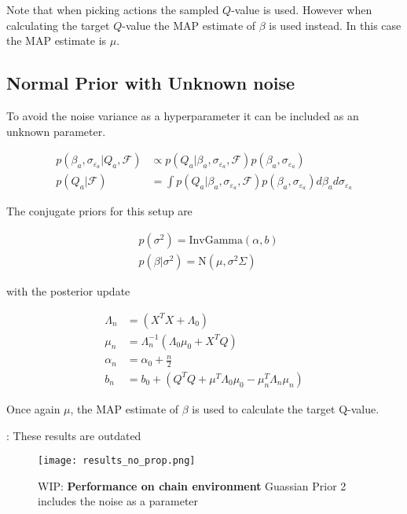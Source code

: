 Note that when picking actions the sampled $Q$-value is used. However when calculating the target $Q$-value the MAP estimate of $\beta$ is used instead. In this case the MAP estimate is $\mu$. 

\subsection{Normal Prior with Unknown noise}

To avoid the noise variance as a hyperparameter it can be included as an unknown parameter.

\begin{align*}
    p(\beta_a, \sigma_{\varepsilon_a}|Q_a, \mathcal{F}) &\propto p(Q_a| \beta_a, \sigma_{\varepsilon_a}, \mathcal{F})p(\beta_a, \sigma_{\varepsilon_a}) \\
    p(Q_a|\mathcal{F}) &= \int p(Q_a|\beta_a, \sigma_{\varepsilon_a}, \mathcal{F}) p(\beta_a, \sigma_{\varepsilon_a})d\beta_a d\sigma_{\varepsilon_a}
\end{align*}

The conjugate priors for this setup are

\begin{align*}
    & p(\sigma^2) = \text{InvGamma}(\alpha, b)          \\
    & p(\beta|\sigma^2) = \text{N}(\mu, \sigma^2\Sigma) 
\end{align*}

with the posterior update

\begin{align*}
	\Lambda_n & = (X^TX + \Lambda_0)                                         \\
	\mu_n     & = \Lambda_n^{-1}(\Lambda_0\mu_0 + X^TQ)                      \\
	\alpha_n  & = \alpha_0 + \frac{n}{2}                                     \\
	b_n       & = b_0 + (Q^TQ + \mu^T\Lambda_0\mu_0 - \mu_n^T\Lambda_n\mu_n) 
\end{align*}

Once again $\mu$, the MAP estimate of $\beta$ is used to calculate the target Q-value.

\todo: These results are outdated

\begin{figure}[H]
    \centering
    \texttt{[image: results\_no\_prop.png]}
    \caption{WIP: \textbf{Performance on chain environment} Guassian Prior 2 includes the noise as a parameter}
    \label{fig:results_no_propr}
\end{figure}


